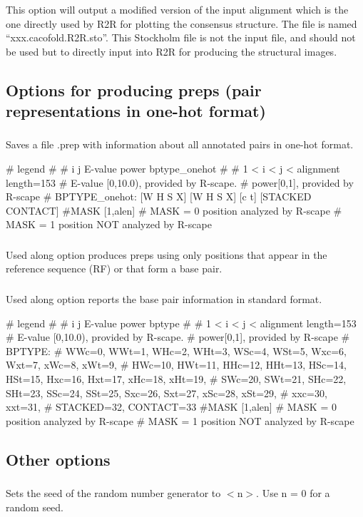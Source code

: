 \subsubsection{} This option will output a modified version of the input alignment which is the one directly used by R2R for plotting the consensus structure. The file is named ``xxx.cacofold.R2R.sto''. This Stockholm file is not the input file, and should not be used but to directly input into R2R for producing the structural images.

\subsection{Options for producing preps (pair representations in one-hot format)}

\subsubsection{} Saves a file .prep with information about all annotated pairs in one-hot format.
\begin{sreoutput}
# legend
#
# i j E-value power bptype_onehot
#
# 1 < i < j < alignment length=153
# E-value [0,10.0), provided by R-scape.
# power[0,1], provided by R-scape
# BPTYPE_onehot: [W H S X] [W H S X] [c t] [STACKED CONTACT]
#MASK [1,alen]
#  MASK = 0 position analyzed by R-scape
#  MASK = 1 position NOT analyzed by R-scape
\end{sreoutput}

\subsubsection{} Used along option  produces preps using only positions that appear in the reference sequence (RF) or that form a base pair.

\subsubsection{} Used along option  reports the base pair information in standard format.
\begin{sreoutput}
# legend
#
# i j E-value power bptype
#
# 1 < i < j < alignment length=153
# E-value [0,10.0), provided by R-scape.
# power[0,1], provided by R-scape
# BPTYPE: 
# WWc=0, WWt=1, WHc=2, WHt=3, WSc=4, WSt=5, Wxc=6, Wxt=7, xWc=8, xWt=9,
# HWc=10, HWt=11, HHc=12, HHt=13, HSc=14, HSt=15, Hxc=16, Hxt=17, xHc=18, xHt=19,
# SWc=20, SWt=21, SHc=22, SHt=23, SSc=24, SSt=25, Sxc=26, Sxt=27, xSc=28, xSt=29,
# xxc=30, xxt=31,
# STACKED=32, CONTACT=33
#MASK [1,alen]
#  MASK = 0 position analyzed by R-scape
#  MASK = 1 position NOT analyzed by R-scape
\end{sreoutput}

\subsection{Other options}

\subsubsection{} Sets the seed of the random number generator to $<$n$>$. Use n = 0 for a random seed.










